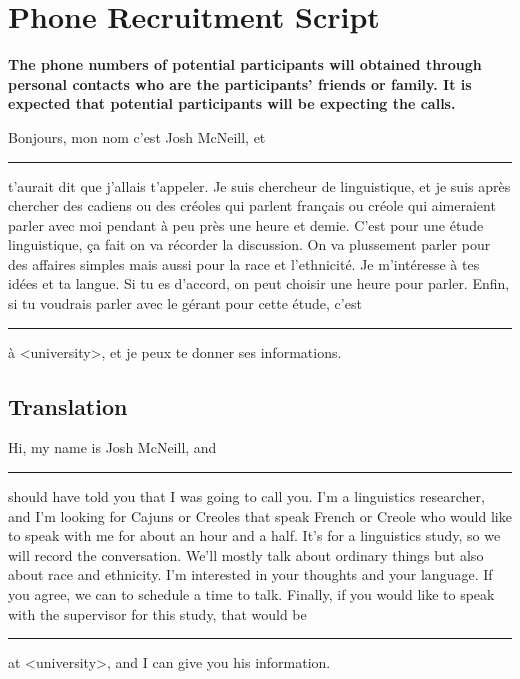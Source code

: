 
\ifdefined \longtrans
\else
  \newcommand{\longtrans}[1]{\[#1\]}
\fi
\ifdefined \setting
\else
  \newcommand{\setting}[1]{\textbf{#1}}
\fi

\section{Phone Recruitment Script}
  \setting{The phone numbers of potential participants will obtained through personal contacts who are the participants' friends or family. It is expected that potential participants will be expecting the calls.}

  \noindent{}Bonjours, mon nom c'est Josh McNeill, et \rule{3cm}{0.4pt} t'aurait dit que j'allais t'appeler.
  Je suis chercheur de linguistique, et je suis après chercher des cadiens ou des créoles qui parlent français ou créole qui aimeraient parler avec moi pendant à peu près une heure et demie.
  C'est pour une étude linguistique, ça fait on va récorder la discussion.
  On va plussement parler pour des affaires simples mais aussi pour la race et l'ethnicité.
  Je m'intéresse à tes idées et ta langue.
  Si tu es d'accord, on peut choisir une heure pour parler.
  Enfin, si tu voudrais parler avec le gérant pour cette étude, c'est \rule{3cm}{0.4pt} à <university>, et je peux te donner ses informations.

  \subsection*{Translation}
    Hi, my name is Josh McNeill, and \rule{3cm}{0.4pt} should have told you that I was going to call you.
    I'm a linguistics researcher, and I'm looking for Cajuns or Creoles that speak French or Creole who would like to speak with me for about an hour and a half.
    It's for a linguistics study, so we will record the conversation.
    We'll mostly talk about ordinary things but also about race and ethnicity.
    I'm interested in your thoughts and your language.
    If you agree, we can to schedule a time to talk.
    Finally, if you would like to speak with the supervisor for this study, that would be \rule{3cm}{0.4pt} at <university>, and I can give you his information.
